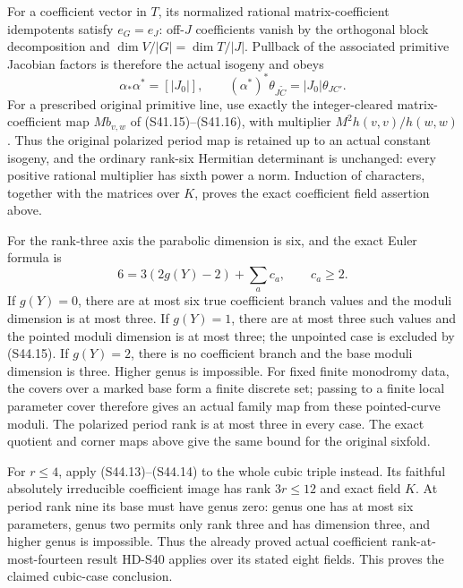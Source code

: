 For a coefficient vector in \(T\), its normalized rational
matrix-coefficient idempotents satisfy \(e_G=e_J\):
off-\(J\) coefficients vanish by the orthogonal block
decomposition and \(\dim V/|G|=\dim T/|J|\).
Pullback of the associated primitive Jacobian factors is
therefore the actual isogeny and obeys
\[
 \alpha_*\alpha^*=[|J_0|],\qquad
 (\alpha^*)^*\theta_{J\widetilde C}=|J_0|\theta_{JC'}.
 \tag{S44.14}
\]
For a prescribed original primitive line, use exactly the
integer-cleared matrix-coefficient map \(M b_{v,w}\) of
(S41.15)--(S41.16), with multiplier
\(M^2h(v,v)/h(w,w)\). Thus the original polarized period
map is retained up to an actual constant isogeny, and the
ordinary rank-six Hermitian determinant is unchanged:
every positive rational multiplier has sixth power a norm.
Induction of characters, together with the matrices over
\(K\), proves the exact coefficient field assertion above.

For the rank-three axis the parabolic dimension is six,
and the exact Euler formula is
\[
              6=3(2g(Y)-2)+\sum_a c_a,\qquad c_a\ge2.
 \tag{S44.15}
\]
If \(g(Y)=0\), there are at most six true coefficient
branch values and the moduli dimension is at most three.
If \(g(Y)=1\), there are at most three such values and
the pointed moduli dimension is at most three; the
unpointed case is excluded by (S44.15). If \(g(Y)=2\),
there is no coefficient branch and the base moduli dimension
is three. Higher genus is impossible. For fixed finite
monodromy data, the covers over a marked base form a finite
discrete set; passing to a finite local parameter cover
therefore gives an actual family map from these pointed-curve
moduli. The polarized period rank is at most three in every
case. The exact quotient and corner maps above give the same
bound for the original sixfold.

For \(r\le4\), apply (S44.13)--(S44.14) to the whole
cubic triple instead. Its faithful absolutely irreducible
coefficient image has rank \(3r\le12\) and exact field
\(K\). At period rank nine its base must have genus zero:
genus one has at most six parameters, genus two permits
only rank three and has dimension three, and higher genus
is impossible. Thus the already proved actual coefficient
rank-at-most-fourteen result HD-S40 applies over its stated
eight fields. This proves the claimed cubic-case conclusion.
